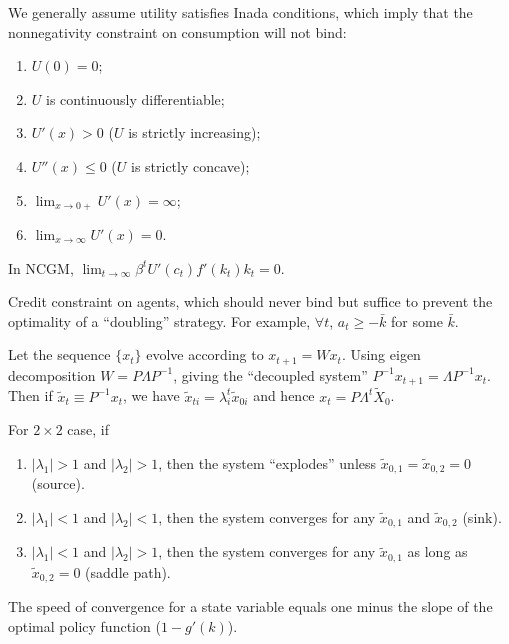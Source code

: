 \documentclass[8pt,letterpaper, landscape]{extarticle} %
\begin{document}
\begin{multicols}{3}
\begin{description}
 We generally assume utility satisfies Inada conditions, which imply that the nonnegativity constraint on consumption will not bind:
\begin{enumerate}
\item $ U(0) = 0 $;
\item $ U $ is continuously differentiable;
\item $ U'(x) > 0 $ ($ U $ is strictly increasing);
\item $ U''(x) \leq 0 $ ($ U $ is strictly concave);
\item $ \lim_{x \to 0+} U'(x) = \infty $;
\item $ \lim_{x \to \infty} U'(x) = 0 $.
\end{enumerate}

 In NCGM, $ \lim_{t \to \infty} \beta^t U'(c_t) f'(k_t) k_t = 0 $.

 Credit constraint on agents, which should never bind but suffice to prevent the optimality of a ``doubling'' strategy. For example, $ \forall t $, $ a_t \geq - \bar{k} $ for some $ \bar{k} $.

 Let the sequence $ \{ x_t \} $ evolve according to $ x_{t+1} = W x_t $. Using eigen decomposition $ W = P \Lambda P^{-1} $, giving the ``decoupled system'' $ P^{-1} x_{t+1} = \Lambda P^{-1} x_t $. Then if $ \tilde{x}_t \equiv P^{-1} x_t $, we have $ \tilde{x}_{ti} = \lambda_i^t \tilde{x}_{0i} $ and hence $ x_t = P \Lambda^t \tilde{X}_0 $.

For $ 2 \times 2 $ case, if
\begin{enumerate}
\item $ | \lambda_1 | > 1 $ and $ | \lambda_2 | > 1 $, then the system ``explodes'' unless $ \tilde{x}_{0,1} = \tilde{x}_{0,2} = 0 $ (source).
\item $ | \lambda_1 | < 1 $ and $ | \lambda_2 | < 1 $, then the system converges for any $ \tilde{x}_{0,1} $ and $ \tilde{x}_{0,2} $ (sink).
\item $ | \lambda_1 | < 1 $ and $ | \lambda_2 | > 1 $, then the system converges for any $ \tilde{x}_{0,1} $ as long as $ \tilde{x}_{0,2} = 0 $ (saddle path).
\end{enumerate}

The speed of convergence for a state variable equals one minus the slope of the optimal policy function ($ 1 - g'(k) $).


\end{description}
\end{multicols}
\end{document}
